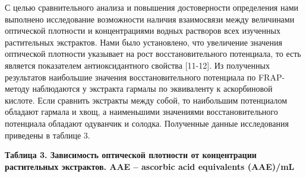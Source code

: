 С целью сравнительного анализа и повышения достоверности определения
нами выполнено исследование возможности наличия взаимосвязи между
величинами оптической плотности и концентрациями водных растворов всех
изученных растительных экстрактов. Нами было установлено, что увеличение
значения оптической плотности указывает на рост восстановительного
потенциала, то есть является показателем антиоксидантного свойства
{[}11-12{]}. Из полученных результатов наибольшие значения
восстановительного потенциала по FRAP-методу наблюдаются у экстракта
гармалы по эквиваленту к аскорбиновой кислоте. Если сравнить экстракты
между собой, то наибольшим потенциалом обладают гармала и хвощ, а
наименьшими значениями восстановительного потенциала обладают одуванчик
и солодка. Полученные данные исследования приведены в таблице 3.

{\bfseries Таблица 3. Зависимость оптической плотности от концентрации
растительных экстрактов. AAE -- ascorbic acid equivalents (AAE)/mL}

